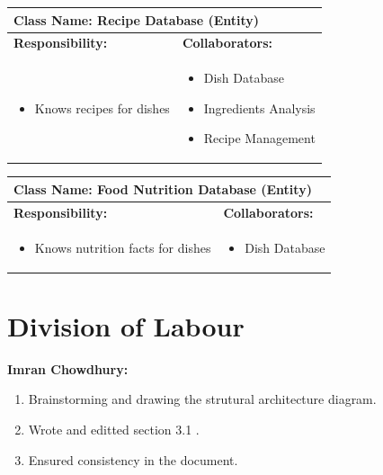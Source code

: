 \documentclass[]{article}
\begin{document}
\begin{table}[H]
	\centering
	\begin{tabular}{|p{7cm}|p{7cm}|}
	\hline 
	 \multicolumn{2}{|l|}{\textbf{Class Name:} Recipe Database (Entity) }\\
	\hline
	\textbf{Responsibility:} & \textbf{Collaborators:} \\
	\hline
	\raggedright
	\begin{itemize}
		\item Knows recipes for dishes
	\end{itemize}
	\vspace{1in} & 
	\begin{itemize}
		\item Dish Database
		\item Ingredients Analysis
		\item Recipe Management
	\end{itemize} \\
	\hline
	\end{tabular}
\end{table}

\begin{table}[H]
	\centering
	\begin{tabular}{|p{7cm}|p{7cm}|}
	\hline 
	 \multicolumn{2}{|l|}{\textbf{Class Name:} Food Nutrition Database (Entity) }\\
	\hline
	\textbf{Responsibility:} & \textbf{Collaborators:} \\
	\hline
	\raggedright
	\begin{itemize}
		\item Knows nutrition facts for dishes
	\end{itemize}
	\vspace{1in} & 
	\begin{itemize}
		\item Dish Database
	\end{itemize} \\
	\hline
	\end{tabular}
\end{table}




\appendix
\section{Division of Labour}
\label{sec:division_of_labour}
\textbf{Imran Chowdhury:}
\begin{enumerate}
	\item Brainstorming and drawing the strutural architecture diagram.
	\item Wrote and editted section 3.1 .
	\item Ensured consistency in the document.
\end{enumerate}
\end{document}

